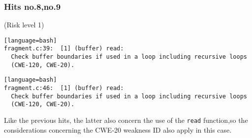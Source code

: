 \documentclass[a4paper,12pt]{article}
\begin{document}
\subsubsection{Hits no.8,no.9} (Risk level 1)

\begin{lstlisting}[style=DOS][language=bash]
fragment.c:39:  [1] (buffer) read:
  Check buffer boundaries if used in a loop including recursive loops
  (CWE-120, CWE-20).
\end{lstlisting}

\begin{lstlisting}[style=DOS][language=bash]
fragment.c:46:  [1] (buffer) read:
  Check buffer boundaries if used in a loop including recursive loops
  (CWE-120, CWE-20).
\end{lstlisting}
Like the previous hits, the latter also concern the use of the \texttt{read} function,so the considerations concerning the CWE-20 weakness ID also apply in this case.\\
\end{document}
